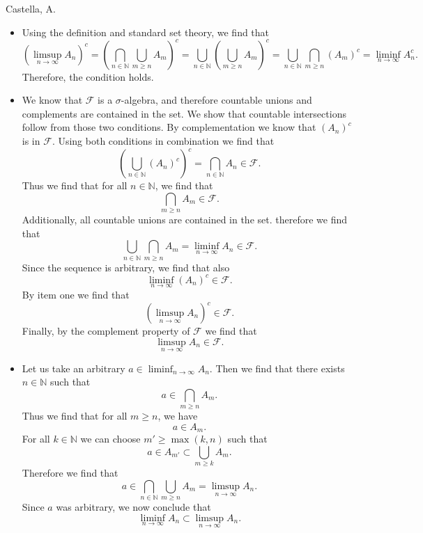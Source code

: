 \begin{solution}[2.3]{Castella, A.}
    \begin{itemize}
        \item Using the definition and standard set theory, we find that
        $$
            (\limsup_{n\rightarrow\infty}A_n)^c = \left(\bigcap_{n\in\mathbb{N}}\bigcup_{m\geq n}A_m\right)^c = \bigcup_{n\in\mathbb{N}}\left(\bigcup_{m\geq n}A_m\right)^c = \bigcup_{n\in\mathbb{N}}\bigcap_{m\geq n}(A_m)^c = \liminf_{n\rightarrow\infty}A_n^c.
        $$
        Therefore, the condition holds.
        \item We know that $\mathcal{F}$ is a $\sigma$-algebra, and therefore countable unions and complements are contained in the set. We show that countable intersections follow from those two conditions. By complementation we know that $(A_n)^c$ is in $\mathcal{F}$. Using both conditions in combination we find that
        $$
            \left(\bigcup_{n\in\mathbb{N}}(A_n)^c\right)^c = \bigcap_{n\in\mathbb{N}}A_n \in \mathcal{F}.
        $$
        Thus we find that for all $n \in \mathbb{N}$, we find that
        $$
            \bigcap_{m\geq n}A_m \in \mathcal{F}.
        $$
        Additionally, all countable unions are contained in the set. therefore we find that
        $$
            \bigcup_{n\in\mathbb{N}}\bigcap_{m\geq n}A_m = \liminf_{n\rightarrow\infty}A_n \in \mathcal{F}.
        $$
        Since the sequence is arbitrary, we find that also 
        $$
            \liminf_{n\rightarrow\infty}(A_n)^c \in \mathcal{F}.
        $$
        By item one we find that
        $$
            (\limsup_{n\rightarrow\infty}A_n)^c \in \mathcal{F}.
        $$
        Finally, by the complement property of $\mathcal{F}$ we find that
        $$
            \limsup_{n\rightarrow\infty}A_n \in \mathcal{F}.
        $$
        \item Let us take an arbitrary $a \in \liminf_{n\rightarrow\infty}A_n$. Then we find that there exists $n \in \mathbb{N}$ such that
        $$
            a\in \bigcap_{m\geq n}A_m.
        $$
        Thus we find that for all $m \geq n$, we have
        $$
            a\in A_m.
        $$
        For all $k \in \mathbb{N}$ we can choose $m' \geq \max(k,n)$ such that
        $$
            a\in A_{m'} \subset \bigcup_{m\geq k}A_m.
        $$
        Therefore we find that
        $$
            a\in \bigcap_{n\in\mathbb{N}}\bigcup_{m\geq n}A_m = \limsup_{n\rightarrow\infty}A_n.
        $$
        Since $a$ was arbitrary, we now conclude that
        $$
            \liminf_{n\rightarrow\infty}A_n \subset \limsup_{n\rightarrow\infty}A_n.
$$
\end{itemize}
\end{solution}
